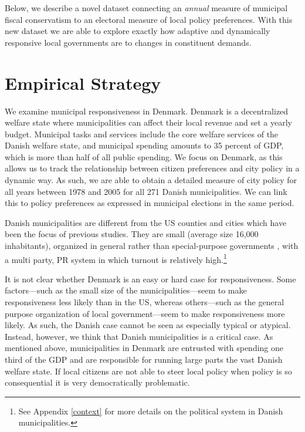 \documentclass[a4paper,12pt]{article}
\begin{document}
 Below, we describe a novel dataset connecting an \textit{annual} measure of municipal fiscal conservatism to an electoral measure of local policy preferences. With this new dataset we are able to explore exactly how adaptive and dynamically responsive local governments are to changes in constituent demands.

\section*{Empirical Strategy}

We examine municipal responsiveness in Denmark. Denmark is a decentralized welfare state where municipalities can affect their local revenue and set a yearly budget.  Municipal tasks and services include the core welfare services of the Danish welfare state, and municipal spending amounts to 35 percent of GDP, which is more than half of all public spending. We focus on Denmark, as this allows us to track the relationship between citizen preferences and city policy in a dynamic way. As such, we are able to obtain a detailed measure of city policy for all years between 1978 and 2005 for all 271 Danish municipalities.  We can link this to policy preferences as expressed in municipal elections in the same period.
 

Danish municipalities are different from the US counties and cities which have been the focus of previous studies. They are small (average size 16,000 inhabitants), organized in general rather than special-purpose governments \citep{berry2009imperfect}, with a multi party, PR system in which turnout is relatively high.\footnote{See Appendix \ref{context} for more details on the political system in Danish municipalities.} 


It is not clear whether Denmark is an easy or hard case for responsiveness.  Some factors---such as the small size of the municipalities---seem to make responsiveness less likely than in the US, whereas others---such as the general purpose organization of local government---seem to make responsiveness more likely. As such, the Danish case cannot be seen as especially typical or atypical. Instead, however, we think that Danish municipalities is a critical case. As mentioned above, municipalities in Denmark are entrusted with spending one third of the GDP and are responsible for running large parts the vast Danish welfare state. If local citizens are not able to steer local policy when policy is so consequential it is very democratically problematic.
\end{document}
